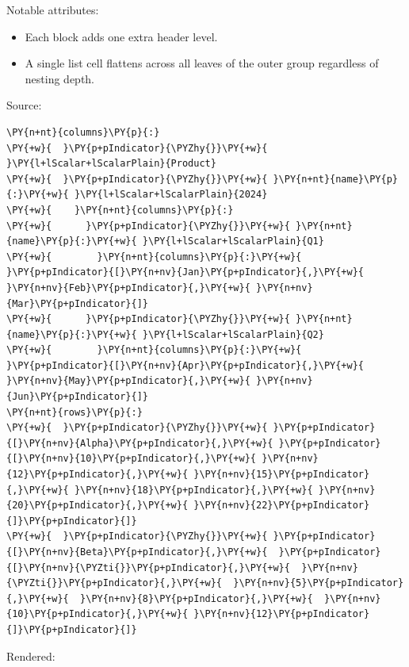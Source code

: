 \documentclass[a4paper,twoside]{article}
\begin{document}
Notable attributes:
\begin{itemize}
\item Each  block adds one extra header level.
\item A single list cell \tscodeinline{[10, 12, 15, 18, 20, 22]} flattens across all leaves of
the outer group regardless of nesting depth.
\end{itemize}
Source:
\begin{tscode}[lang=yaml, engine=pygments]
\begin{Verbatim}[commandchars=\\\{\},breaklines, breakanywhere, commandchars=\\\{\}]
\PY{n+nt}{columns}\PY{p}{:}
\PY{+w}{  }\PY{p+pIndicator}{\PYZhy{}}\PY{+w}{ }\PY{l+lScalar+lScalarPlain}{Product}
\PY{+w}{  }\PY{p+pIndicator}{\PYZhy{}}\PY{+w}{ }\PY{n+nt}{name}\PY{p}{:}\PY{+w}{ }\PY{l+lScalar+lScalarPlain}{2024}
\PY{+w}{    }\PY{n+nt}{columns}\PY{p}{:}
\PY{+w}{      }\PY{p+pIndicator}{\PYZhy{}}\PY{+w}{ }\PY{n+nt}{name}\PY{p}{:}\PY{+w}{ }\PY{l+lScalar+lScalarPlain}{Q1}
\PY{+w}{        }\PY{n+nt}{columns}\PY{p}{:}\PY{+w}{ }\PY{p+pIndicator}{[}\PY{n+nv}{Jan}\PY{p+pIndicator}{,}\PY{+w}{ }\PY{n+nv}{Feb}\PY{p+pIndicator}{,}\PY{+w}{ }\PY{n+nv}{Mar}\PY{p+pIndicator}{]}
\PY{+w}{      }\PY{p+pIndicator}{\PYZhy{}}\PY{+w}{ }\PY{n+nt}{name}\PY{p}{:}\PY{+w}{ }\PY{l+lScalar+lScalarPlain}{Q2}
\PY{+w}{        }\PY{n+nt}{columns}\PY{p}{:}\PY{+w}{ }\PY{p+pIndicator}{[}\PY{n+nv}{Apr}\PY{p+pIndicator}{,}\PY{+w}{ }\PY{n+nv}{May}\PY{p+pIndicator}{,}\PY{+w}{ }\PY{n+nv}{Jun}\PY{p+pIndicator}{]}
\PY{n+nt}{rows}\PY{p}{:}
\PY{+w}{  }\PY{p+pIndicator}{\PYZhy{}}\PY{+w}{ }\PY{p+pIndicator}{[}\PY{n+nv}{Alpha}\PY{p+pIndicator}{,}\PY{+w}{ }\PY{p+pIndicator}{[}\PY{n+nv}{10}\PY{p+pIndicator}{,}\PY{+w}{ }\PY{n+nv}{12}\PY{p+pIndicator}{,}\PY{+w}{ }\PY{n+nv}{15}\PY{p+pIndicator}{,}\PY{+w}{ }\PY{n+nv}{18}\PY{p+pIndicator}{,}\PY{+w}{ }\PY{n+nv}{20}\PY{p+pIndicator}{,}\PY{+w}{ }\PY{n+nv}{22}\PY{p+pIndicator}{]}\PY{p+pIndicator}{]}
\PY{+w}{  }\PY{p+pIndicator}{\PYZhy{}}\PY{+w}{ }\PY{p+pIndicator}{[}\PY{n+nv}{Beta}\PY{p+pIndicator}{,}\PY{+w}{  }\PY{p+pIndicator}{[}\PY{n+nv}{\PYZti{}}\PY{p+pIndicator}{,}\PY{+w}{  }\PY{n+nv}{\PYZti{}}\PY{p+pIndicator}{,}\PY{+w}{  }\PY{n+nv}{5}\PY{p+pIndicator}{,}\PY{+w}{  }\PY{n+nv}{8}\PY{p+pIndicator}{,}\PY{+w}{  }\PY{n+nv}{10}\PY{p+pIndicator}{,}\PY{+w}{ }\PY{n+nv}{12}\PY{p+pIndicator}{]}\PY{p+pIndicator}{]}
\end{Verbatim}
\end{tscode}
Rendered:
\end{document}
